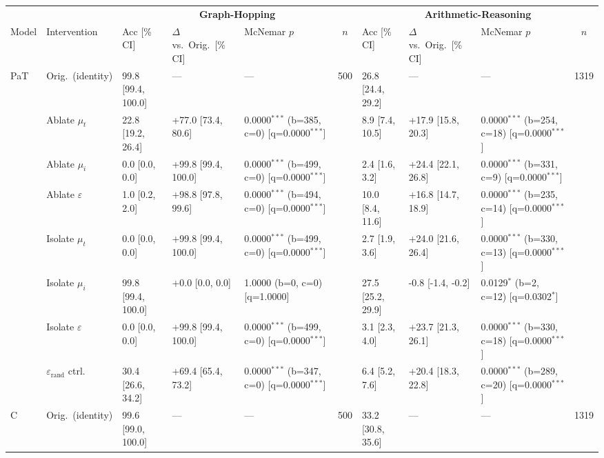 \begin{table}[h!]
\centering
\tiny
\setlength{\tabcolsep}{4pt}
\begin{tabular}{ll lllc lllc}
\toprule
 & & \multicolumn{4}{c}{\textbf{Graph-Hopping}} & \multicolumn{4}{c}{\textbf{Arithmetic-Reasoning}} \\
\cmidrule(lr){3-6} \cmidrule(lr){7-10}
Model & Intervention & Acc [\% CI] & $\Delta$ vs.\ Orig.\ [\% CI] & McNemar $p$ & $n$ & Acc [\% CI] & $\Delta$ vs.\ Orig.\ [\% CI] & McNemar $p$ & $n$ \\
\midrule
\multirow{8}{*}{PaT} & Orig.\ (identity) & 99.8 [99.4, 100.0] & --- & --- & 500 & 26.8 [24.4, 29.2] & --- & --- & 1319 \\
 & Ablate $\mu_t$ & 22.8 [19.2, 26.4] & +77.0 [73.4, 80.6] & 0.0000$^{***}$ (b=385, c=0) [q=0.0000$^{***}$] &  & 8.9 [7.4, 10.5] & +17.9 [15.8, 20.3] & 0.0000$^{***}$ (b=254, c=18) [q=0.0000$^{***}$] &  \\
 & Ablate $\mu_i$ & 0.0 [0.0, 0.0] & +99.8 [99.4, 100.0] & 0.0000$^{***}$ (b=499, c=0) [q=0.0000$^{***}$] &  & 2.4 [1.6, 3.2] & +24.4 [22.1, 26.8] & 0.0000$^{***}$ (b=331, c=9) [q=0.0000$^{***}$] &  \\
 & Ablate $\varepsilon$ & 1.0 [0.2, 2.0] & +98.8 [97.8, 99.6] & 0.0000$^{***}$ (b=494, c=0) [q=0.0000$^{***}$] &  & 10.0 [8.4, 11.6] & +16.8 [14.7, 18.9] & 0.0000$^{***}$ (b=235, c=14) [q=0.0000$^{***}$] &  \\
 & Isolate $\mu_t$ & 0.0 [0.0, 0.0] & +99.8 [99.4, 100.0] & 0.0000$^{***}$ (b=499, c=0) [q=0.0000$^{***}$] &  & 2.7 [1.9, 3.6] & +24.0 [21.6, 26.4] & 0.0000$^{***}$ (b=330, c=13) [q=0.0000$^{***}$] &  \\
 & Isolate $\mu_i$ & 99.8 [99.4, 100.0] & +0.0 [0.0, 0.0] & 1.0000 (b=0, c=0) [q=1.0000] &  & 27.5 [25.2, 29.9] & -0.8 [-1.4, -0.2] & 0.0129$^{*}$ (b=2, c=12) [q=0.0302$^{*}$] &  \\
 & Isolate $\varepsilon$ & 0.0 [0.0, 0.0] & +99.8 [99.4, 100.0] & 0.0000$^{***}$ (b=499, c=0) [q=0.0000$^{***}$] &  & 3.1 [2.3, 4.0] & +23.7 [21.3, 26.1] & 0.0000$^{***}$ (b=330, c=18) [q=0.0000$^{***}$] &  \\
 & $\varepsilon_\mathrm{rand}$ ctrl. & 30.4 [26.6, 34.2] & +69.4 [65.4, 73.2] & 0.0000$^{***}$ (b=347, c=0) [q=0.0000$^{***}$] &  & 6.4 [5.2, 7.6] & +20.4 [18.3, 22.8] & 0.0000$^{***}$ (b=289, c=20) [q=0.0000$^{***}$] &  \\
\cmidrule(lr){2-10}
\multirow{8}{*}{C} & Orig.\ (identity) & 99.6 [99.0, 100.0] & --- & --- & 500 & 33.2 [30.8, 35.6] & --- & --- & 1319 \\

\end{tabular}
\end{table}
